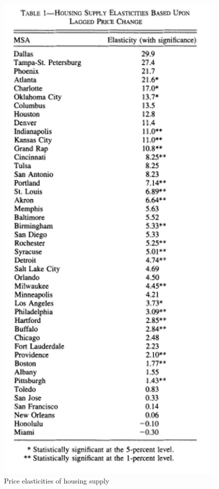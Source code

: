 \documentclass[
]{book}
\begin{document}
\begin{figure}
\includegraphics[width=6.08in]{./figures/green} \caption{Price elasticities of housing supply }\label{fig:green}
\end{figure}
\end{document}
